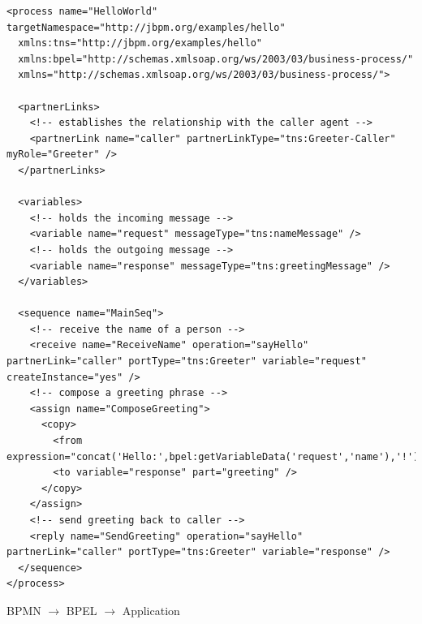 \lstset{style=xml,caption=BPEL,basicstyle=\scriptsize\ttfamily,label=listing:bpel}
\lstset{language=XML}
\begin{lstlisting}
<process name="HelloWorld" targetNamespace="http://jbpm.org/examples/hello"
  xmlns:tns="http://jbpm.org/examples/hello"
  xmlns:bpel="http://schemas.xmlsoap.org/ws/2003/03/business-process/"
  xmlns="http://schemas.xmlsoap.org/ws/2003/03/business-process/">

  <partnerLinks>
    <!-- establishes the relationship with the caller agent -->
    <partnerLink name="caller" partnerLinkType="tns:Greeter-Caller" myRole="Greeter" />
  </partnerLinks>

  <variables>
    <!-- holds the incoming message -->
    <variable name="request" messageType="tns:nameMessage" />
    <!-- holds the outgoing message -->
    <variable name="response" messageType="tns:greetingMessage" />
  </variables>

  <sequence name="MainSeq">
    <!-- receive the name of a person -->
    <receive name="ReceiveName" operation="sayHello" partnerLink="caller" portType="tns:Greeter" variable="request" createInstance="yes" />
    <!-- compose a greeting phrase -->
    <assign name="ComposeGreeting">
      <copy>
        <from expression="concat('Hello:',bpel:getVariableData('request','name'),'!')"/>
        <to variable="response" part="greeting" />
      </copy>
    </assign>
    <!-- send greeting back to caller -->
    <reply name="SendGreeting" operation="sayHello" partnerLink="caller" portType="tns:Greeter" variable="response" />
  </sequence>
</process>
\end{lstlisting}

\begin{centering}
BPMN $\rightarrow$ BPEL $\rightarrow$ Application
\end{centering}